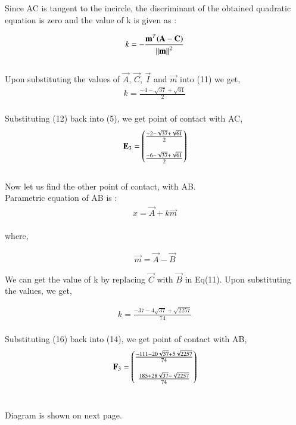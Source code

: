 \documentclass[journal,12pt,twocolumn]{IEEEtran}
\theoremstyle{remark}
\begin{document}
\begin{flushleft}
	Since AC is tangent to the incircle, the discriminant of the obtained quadratic equation is zero and the value of k is given as :

	\begin{align}
		k = -\frac{\mathbf{m}^T(\mathbf{A} - \mathbf{C})}{\left\lVert\mathbf{m}\right\rVert^2}
	\end{align}\\

	Upon substituting the values of $\vec{A}$, $\vec{C}$, $\vec{I}$ and $\vec{m}$ into (11) we get,  
	\begin{align}
		k = \frac{-4-\sqrt{37}+\sqrt{61}}{2}
	\end{align}\\

	Substituting (12) back into (5), we get point of contact with AC,
	\begin{align}
		\mathbf{E}_3 = \begin{pmatrix}
			\frac{-2-\sqrt{37}+\sqrt{61}}{2}\\ \\
			\frac{-6-\sqrt{37}+\sqrt{61}}{2}
		\end{pmatrix}
	\end{align}\\

	\bigskip
	Now let us find the other point of contact, with AB.\\
	\bigskip
	Parametric equation of AB is : 
	\begin{align}
		x = \vec{A} + k\vec{m}
	\end{align}\\

	where,

	\begin{align}
		\vec{m} = \vec{A} - \vec{B}
	\end{align}

	We can get the value of k by replacing $\vec{C}$ with $\vec{B}$ in Eq(11). Upon substituting the values, we get, 

	\begin{align}
		k = \frac{-37-4\sqrt{37}+\sqrt{2257}}{74}
	\end{align}\\

	Substituting (16) back into (14), we get point of contact with AB,
	\begin{align}
		\mathbf{F}_3 = \begin{pmatrix}
			\frac{-111-20\sqrt{37}+5\sqrt{2257}}{74}\\ \\
			\frac{185+28\sqrt{37}-\sqrt{2257}}{74}
		\end{pmatrix}
	\end{align}\\
	
	\bigskip

	Diagram is shown on next page.

\end{flushleft}
\end{document}
